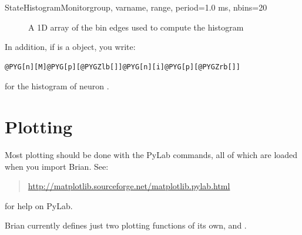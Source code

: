 \documentclass[letterpaper,10pt,english]{manual}
\begin{document}
\begin{classdesc}{StateHistogramMonitor}{group, varname, range, period=1.0 ms, nbins=20}
\begin{description}
\item[] \leavevmode
A 1D array of the bin edges used to compute the histogram

\end{description}

In addition, if  is a \hyperlink{brian.StateHistogramMonitor}{} object, you write:

\begin{Verbatim}[commandchars=@\[\]]
@PYG[n][M]@PYG[p][@PYGZlb[]]@PYG[n][i]@PYG[p][@PYGZrb[]]
\end{Verbatim}

for the histogram of neuron .
\end{classdesc}

\resetcurrentobjects
\hypertarget{--doc-reference-plotting}{}

\hypertarget{index-102}{}\section{Plotting}
Most plotting should be done with the PyLab commands, all of
which are loaded when you import Brian. See:
\begin{quote}

\href{http://matplotlib.sourceforge.net/matplotlib.pylab.html}{http://matplotlib.sourceforge.net/matplotlib.pylab.html}
\end{quote}

for help on PyLab.

Brian currently defines just two plotting functions of its own,
\hyperlink{brian.raster_plot}{} and \hyperlink{brian.hist_plot}{}.
\end{document}
